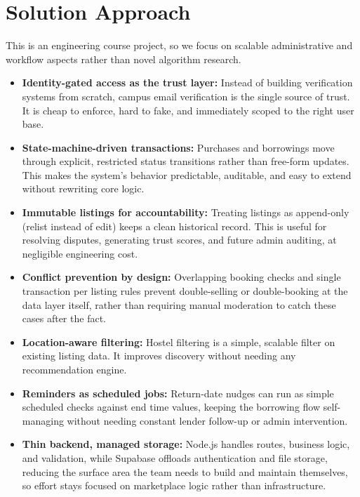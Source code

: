 \documentclass[12pt,a4paper]{article}
\begin{document}
\section{Solution Approach}
This is an engineering course project, so we focus on scalable administrative and workflow aspects rather than novel algorithm research.%
\begin{itemize}[leftmargin=0.7cm]
    \item \textbf{Identity-gated access as the trust layer:} Instead of building verification systems from scratch, campus email verification is the single source of trust. It is cheap to enforce, hard to fake, and immediately scoped to the right user base.
    \item \textbf{State-machine-driven transactions:} Purchases and borrowings move through explicit, restricted status transitions rather than free-form updates. This makes the system's behavior predictable, auditable, and easy to extend without rewriting core logic.
    \item \textbf{Immutable listings for accountability:} Treating listings as append-only (relist instead of edit) keeps a clean historical record. This is useful for resolving disputes, generating trust scores, and future admin auditing, at negligible engineering cost.
    \item \textbf{Conflict prevention by design:} Overlapping booking checks and single transaction per listing rules prevent double-selling or double-booking at the data layer itself, rather than requiring manual moderation to catch these cases after the fact.
    \item \textbf{Location-aware filtering:} Hostel filtering is a simple, scalable filter on existing listing data. It improves discovery without needing any recommendation engine.
    \item \textbf{Reminders as scheduled jobs:} Return-date nudges can run as simple scheduled checks against end time values, keeping the borrowing flow self-managing without needing constant lender follow-up or admin intervention.
    \item \textbf{Thin backend, managed storage:} Node.js handles routes, business logic, and validation, while Supabase offloads authentication and file storage, reducing the surface area the team needs to build and maintain themselves, so effort stays focused on marketplace logic rather than infrastructure.
\end{itemize}
\end{document}
